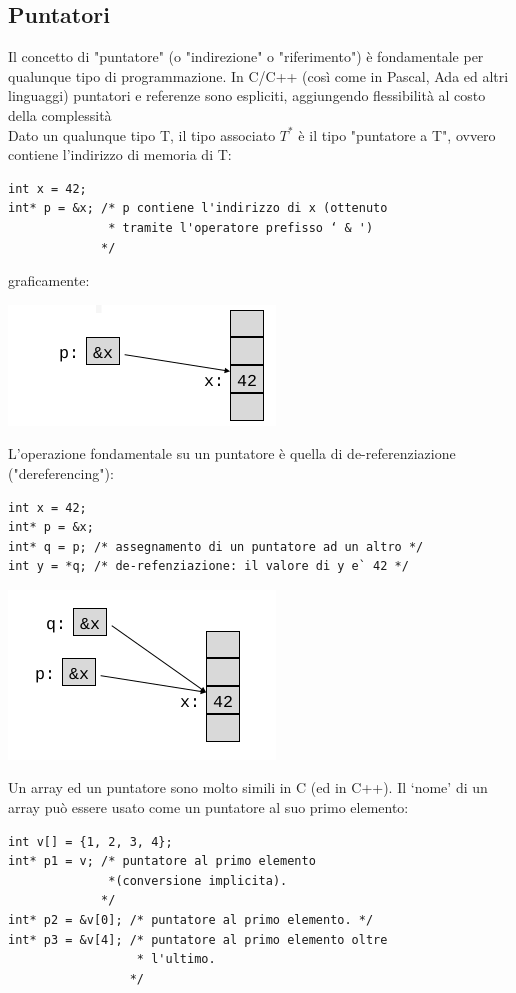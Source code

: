 \documentclass[a4paper,12pt, oneside]{book}
\begin{document}
\subsection{Puntatori}
Il concetto di "puntatore" (o "indirezione" o "riferimento") è fondamentale per qualunque tipo di programmazione. In C/C++ (così come in Pascal, Ada ed altri linguaggi) puntatori
e referenze sono espliciti, aggiungendo flessibilità al costo della complessità\\
Dato un qualunque tipo T, il tipo associato $T^*$ è il tipo "puntatore a T", ovvero contiene l'indirizzo di memoria di T:
\begin{verbatim}
int x = 42;
int* p = &x; /* p contiene l'indirizzo di x (ottenuto
              * tramite l'operatore prefisso ‘ & ')
             */
\end{verbatim}
graficamente:
\begin{center}
\includegraphics[scale=3]{img/c.png}
\end{center}
L'operazione fondamentale su un puntatore è quella di
de-referenziazione ("dereferencing"):
\begin{verbatim}
int x = 42;
int* p = &x;
int* q = p; /* assegnamento di un puntatore ad un altro */
int y = *q; /* de-refenziazione: il valore di y e` 42 */
\end{verbatim}
\begin{center}
\includegraphics[scale=3]{img/c2.png}
\end{center}
\newpage
Un array ed un puntatore sono molto simili in C (ed in C++). Il ‘nome' di un array può essere usato come un puntatore al suo primo elemento:
\begin{verbatim}
int v[] = {1, 2, 3, 4};
int* p1 = v; /* puntatore al primo elemento
              *(conversione implicita).
             */
int* p2 = &v[0]; /* puntatore al primo elemento. */
int* p3 = &v[4]; /* puntatore al primo elemento oltre
                  * l'ultimo.
                 */
\end{verbatim}
\end{document}
